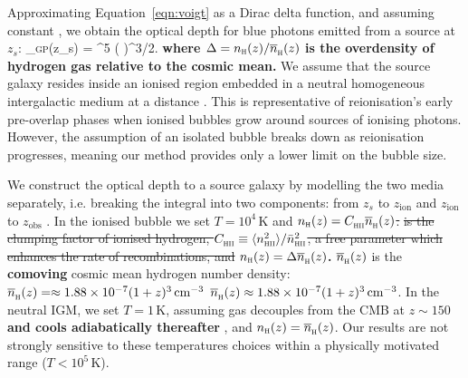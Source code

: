 \documentclass[fleqn,usenatbib]{mnras}
\providecommand{\DIFadd}[1]{{\protect\color{Green} \bf #1}} %
\providecommand{\DIFdel}[1]{{\protect\color{lightgray} \footnotesize \sout{#1}}} %
\providecommand{\DIFaddbegin}{} %
\providecommand{\DIFaddend}{} %
\providecommand{\DIFdelbegin}{} %
\providecommand{\DIFdelend}{} %
\newcommand{\DIFscaledelfig}{0.5}
\newlength{\DIFdelgraphicswidth} %
\newlength{\DIFdelgraphicsheight} %
\newcommand{\DIFaddincludegraphics}[2][]{{\color{blue}\fbox{\DIFOincludegraphics[#1]{#2}}}} %
\newcommand{\DIFdelincludegraphics}[2][]{%
\sbox{\DIFdelgraphicsbox}{\DIFOincludegraphics[#1]{#2}}%
\settoboxwidth{\DIFdelgraphicswidth}{\DIFdelgraphicsbox} %
\settoboxtotalheight{\DIFdelgraphicsheight}{\DIFdelgraphicsbox} %
\scalebox{\DIFscaledelfig}{%
\parbox[b]{\DIFdelgraphicswidth}{\usebox{\DIFdelgraphicsbox}\\[-\baselineskip] \rule{\DIFdelgraphicswidth}{0em}}\llap{\resizebox{\DIFdelgraphicswidth}{\DIFdelgraphicsheight}{%
\setlength{\unitlength}{\DIFdelgraphicswidth}%
\begin{picture}(1,1)%
\thicklines\linethickness{2pt} %
{\color[rgb]{1,0,0}\put(0,0){\framebox(1,1){}}}%
{\color[rgb]{1,0,0}\put(0,0){\line( 1,1){1}}}%
{\color[rgb]{1,0,0}\put(0,1){\line(1,-1){1}}}%
\end{picture}%
}\hspace*{3pt}}} %
} %
\DeclareRobustCommand{\DIFaddbegin}{\DIFOaddbegin \let\includegraphics\DIFaddincludegraphics} %
\DeclareRobustCommand{\DIFaddend}{\DIFOaddend \let\includegraphics\DIFOincludegraphics} %
\DeclareRobustCommand{\DIFdelbegin}{\DIFOdelbegin \let\includegraphics\DIFdelincludegraphics} %
\DeclareRobustCommand{\DIFdelend}{\DIFOaddend \let\includegraphics\DIFOincludegraphics} %
\begin{document}
Approximating Equation~\eqref{eqn:voigt} as a Dirac delta function, and assuming constant \xHI, we obtain the \citet{Gunn1965} optical depth for blue photons emitted from a source at $z_s$:
%
\BE \label{eqn:tau_GP}
\tau_\textsc{gp}(z_s) =   ^5 \xHI \DIFaddbegin \DIFadd{\Delta }\DIFaddend \left(\DIFdelbegin \DIFdel{}%
\DIFdelend {}\right)^{3/2}.
\EE
%
\DIFaddbegin \DIFadd{where $\Delta=n_\textsc{h}(z)/\nh(z)$ is the overdensity of hydrogen gas relative to the cosmic mean. }\DIFaddend We assume that the source galaxy resides inside an ionised region embedded in a neutral homogeneous intergalactic medium at a distance \Rion. This is representative of reionisation's early pre-overlap phases when ionised bubbles grow around sources of ionising photons. However, the assumption of an isolated bubble breaks down as reionisation progresses, meaning our method provides only a lower limit on the bubble size.

We construct the optical depth to a source galaxy by modelling the two media separately, i.e. breaking the integral into two components: from $z_s$ to $z_\textrm{ion}$ and $z_\textrm{ion}$ to $z_\mathrm{obs}$ \citep[following,][]{Haiman2002,Cen2000,Mesinger2004}. In the ionised bubble we set $T=10^4$\,K \citep[appropriate for photoionised gas at the mean density, e.g.,][]{Hui1997} and \DIFdelbegin \DIFdel{$n_\textsc{h}(z) = \clump \nh(z)$. }%
\DIFdel{is the clumping factor of ionised hydrogen, $\clump \equiv \langle n_\HII^2\rangle / \bar n_\HII^2$, a free parameter which enhances the rate of recombinations, and }\DIFdelend \DIFaddbegin \DIFadd{$n_\textsc{h}(z) = \Delta \nh(z)$. }\DIFaddend $\nh(z)$ is the \DIFaddbegin \DIFadd{comoving }\DIFaddend cosmic mean hydrogen number density: \DIFdelbegin \DIFdel{$\nh(z) = \approx 1.88\times10^{-7} (1+z)^3\cm^{-3}$}\DIFdelend \DIFaddbegin \DIFadd{$\nh(z) \approx 1.88\times10^{-7} (1+z)^3\cm^{-3}$}\DIFaddend . In the neutral IGM, we set $T=1$\,K, assuming gas decouples from the CMB at $z\sim150$ \DIFaddbegin \DIFadd{and cools adiabatically thereafter }\DIFaddend \citep{Peebles1993}, and $n_\textsc{h}(z) = \nh(z)$. Our results are not strongly sensitive to these temperatures choices within a physically motivated range ($T<10^5$\,K).
\end{document}
